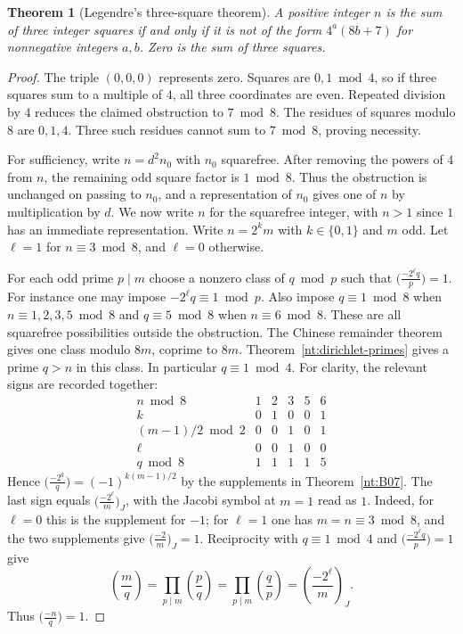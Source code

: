 \documentclass[11pt,oneside,openany]{book}
\theoremstyle{plain}
\newtheorem{theorem}{Theorem}[chapter]
\theoremstyle{definition}
\theoremstyle{remark}
\begin{document}
\begin{theorem}[Legendre's three-square theorem]\label{nt:D06}
A positive integer \(n\) is the sum of three integer squares if and
only if it is not of the form \(4^a(8b+7)\) for nonnegative integers
\(a,b\). Zero is the sum of three squares.
\end{theorem}
\begin{proof}
The triple \((0,0,0)\) represents zero. Squares are \(0,1\bmod4\),
so if three squares sum to a multiple
of \(4\), all three coordinates are even. Repeated division by \(4\)
reduces the claimed obstruction to \(7\bmod8\). The residues of
squares modulo \(8\) are \(0,1,4\). Three such residues cannot sum to
\(7\bmod8\), proving necessity.

For sufficiency, write \(n=d^2 n_0\) with \(n_0\) squarefree.
After removing the powers of \(4\) from \(n\), the remaining
odd square factor is \(1\bmod8\). Thus the obstruction is unchanged
on passing to \(n_0\), and a representation of \(n_0\) gives one of
\(n\) by multiplication by \(d\). We now write \(n\) for the
squarefree integer, with \(n>1\) since \(1\) has an immediate
representation. Write \(n=2^k m\) with \(k\in\{0,1\}\) and \(m\) odd.
Let \(\ell=1\) for \(n\equiv3\bmod8\), and \(\ell=0\) otherwise.

For each odd prime \(p\mid m\) choose a nonzero class of \(q\bmod p\)
such that \(\bigl(\frac{-2^\ell q}{p}\bigr)=1\). For instance one
may impose \(-2^\ell q\equiv1\bmod p\). Also impose \(q\equiv1\bmod8\)
when \(n\equiv1,2,3,5\bmod8\) and \(q\equiv5\bmod8\) when
\(n\equiv6\bmod8\). These are all squarefree possibilities outside
the obstruction. The Chinese remainder theorem gives one class
modulo \(8m\), coprime to \(8m\). Theorem~\ref{nt:dirichlet-primes}
gives a prime \(q>n\) in this class. In particular \(q\equiv1\bmod4\).
For clarity, the relevant signs are recorded together:
\[
\begin{array}{c|ccccc}
 n\bmod 8 &1&2&3&5&6\\ \hline
 k &0&1&0&0&1\\
 (m-1)/2\bmod2 &0&0&1&0&1\\
 \ell &0&0&1&0&0\\
 q\bmod8 &1&1&1&1&5
\end{array}
\]
Hence \(\bigl(\frac{-2^k}{q}\bigr)=(-1)^{k(m-1)/2}\) by the
supplements in Theorem~\ref{nt:B07}. The last sign equals
\(\bigl(\frac{-2^\ell}{m}\bigr)_{\!J}\), with the Jacobi symbol at
\(m=1\) read as \(1\). Indeed, for \(\ell=0\) this is the supplement
for \(-1\); for \(\ell=1\) one has \(m=n\equiv3\bmod8\), and the
two supplements give \(\bigl(\frac{-2}{m}\bigr)_{\!J}=1\).
Reciprocity with \(q\equiv1\bmod4\) and
\(\bigl(\frac{-2^\ell q}{p}\bigr)=1\) give
\[
 \left(\frac{m}{q}\right)
  =\prod_{p\mid m}\left(\frac{p}{q}\right)
  =\prod_{p\mid m}\left(\frac{q}{p}\right)
  =\left(\frac{-2^\ell}{m}\right)_{\!J}.
\]
Thus \(\bigl(\frac{-n}{q}\bigr)=1\).


\end{proof}
\end{document}
